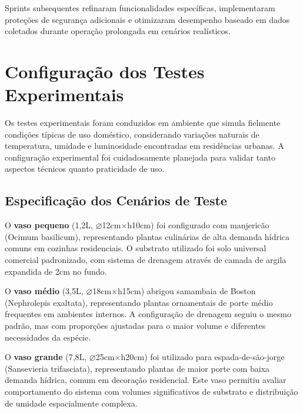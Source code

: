 Sprints subsequentes refinaram funcionalidades específicas, implementaram proteções de segurança adicionais e otimizaram desempenho baseado em dados coletados durante operação prolongada em cenários realísticos.

\section{Configuração dos Testes Experimentais}

Os testes experimentais foram conduzidos em ambiente que simula fielmente condições típicas de uso doméstico, considerando variações naturais de temperatura, umidade e luminosidade encontradas em residências urbanas. A configuração experimental foi cuidadosamente planejada para validar tanto aspectos técnicos quanto praticidade de uso.


\subsection{Especificação dos Cenários de Teste}

O \textbf{vaso pequeno} (1,2L, ⌀12cm×h10cm) foi configurado com manjericão (Ocimum basilicum), representando plantas culinárias de alta demanda hídrica comuns em cozinhas residenciais. O substrato utilizado foi solo universal comercial padronizado, com sistema de drenagem através de camada de argila expandida de 2cm no fundo.

O \textbf{vaso médio} (3,5L, ⌀18cm×h15cm) abrigou samambaia de Boston (Nephrolepis exaltata), representando plantas ornamentais de porte médio frequentes em ambientes internos. A configuração de drenagem seguiu o mesmo padrão, mas com proporções ajustadas para o maior volume e diferentes necessidades da espécie.

O \textbf{vaso grande} (7,8L, ⌀25cm×h20cm) foi utilizado para espada-de-são-jorge (Sansevieria trifasciata), representando plantas de maior porte com baixa demanda hídrica, comum em decoração residencial. Este vaso permitiu avaliar comportamento do sistema com volumes significativos de substrato e distribuição de umidade espacialmente complexa.

